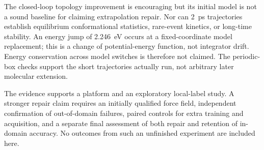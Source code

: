 The closed-loop topology improvement is encouraging but its initial
model is not a sound baseline for claiming extrapolation repair.
Nor can 2~ps trajectories establish equilibrium conformational
statistics, rare-event kinetics, or long-time stability. An energy
jump of 2.246~eV occurs at a fixed-coordinate model replacement;
this is a change of potential-energy function, not integrator drift.
Energy conservation across model switches is therefore not claimed.
The periodic-box checks support the short trajectories actually
run, not arbitrary later molecular extension.

The evidence supports a platform and an exploratory local-label study.
A stronger repair claim requires an initially qualified force field,
independent confirmation of out-of-domain failures, paired controls
for extra training and acquisition, and a separate final assessment
of both repair and retention of in-domain accuracy. No outcomes
from such an unfinished experiment are included here.
